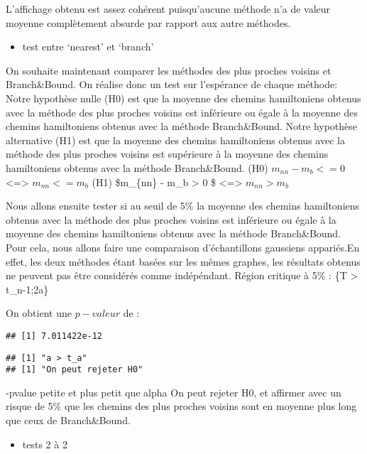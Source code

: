 \documentclass[]{article}
\providecommand{\tightlist}{%
  \setlength{\itemsep}{0pt}\setlength{\parskip}{0pt}}
\begin{document}
L'affichage obtenu est assez cohérent puisqu'aucune méthode n'a de
valeur moyenne complètement absurde par rapport aux autre méthodes.

\begin{itemize}
\tightlist
\item
  test entre `nearest' et `branch'
\end{itemize}

On souhaite maintenant comparer les méthodes des plus proches voisins et
Branch\&Bound. On réalise donc un test sur l'espérance de chaque
méthode: Notre hypothèse nulle (H0) est que la moyenne des chemins
hamiltoniens obtenus avec la méthode des plus proches voisins est
inférieure ou égale à la moyenne des chemins hamiltoniens obtenus avec
la méthode Branch\&Bound. Notre hypothèse alternative (H1) est que la
moyenne des chemins hamiltoniens obtenus avec la méthode des plus
proches voisins est supérieure à la moyenne des chemins hamiltoniens
obtenus avec la méthode Branch\&Bound. (H0) \(m_{nn} - m_b <= 0\)
\textless{}=\textgreater{} \(m_{nn} <= m_b\) (H1) \$m\_\{nn\} - m\_b
\textgreater{} 0 \$ \textless{}=\textgreater{} \(m_{nn} > m_b\)

Nous allons ensuite tester si au seuil de 5\% la moyenne des chemins
hamiltoniens obtenus avec la méthode des plus proches voisins est
inférieure ou égale à la moyenne des chemins hamiltoniens obtenus avec
la méthode Branch\&Bound. Pour cela, nous allons faire une comparaison
d'échantillons gaussiens appariés.En effet, les deux méthodes étant
basées sur les mêmes graphes, les résultats obtenus ne peuvent pas être
considérés comme indépéndant. Région critique à 5\% : \{T \textgreater{}
t\_n-1;2a\}

On obtient une \(p-{valeur}\) de :

\begin{verbatim}
## [1] 7.011422e-12
\end{verbatim}

\begin{verbatim}
## [1] "a > t_a"
## [1] "On peut rejeter H0"
\end{verbatim}

-pvalue petite et plus petit que alpha On peut rejeter H0, et affirmer
avec un risque de 5\% que les chemins des plus proches voisins sont en
moyenne plus long que ceux de Branch\&Bound.

\begin{itemize}
\tightlist
\item
  tests 2 à 2
\end{itemize}
\end{document}
